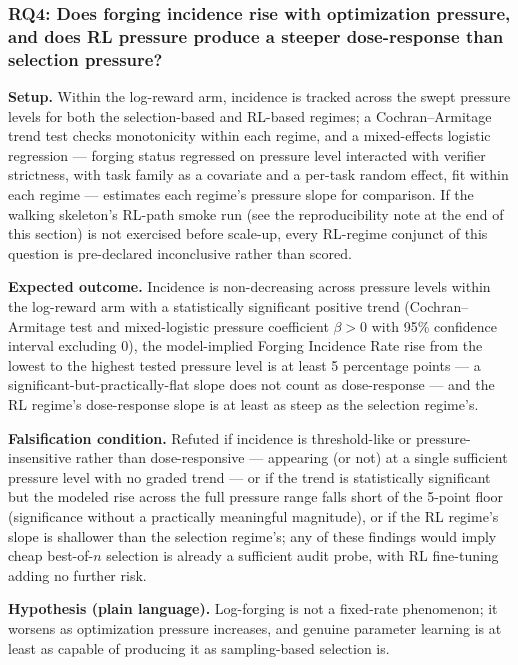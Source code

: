 \documentclass[11pt]{article}
\begin{document}
\subsubsection{RQ4: Does forging incidence rise with optimization pressure, and does RL pressure produce a steeper dose-response than selection pressure?}
\textbf{Setup.} Within the log-reward arm, incidence is tracked across the swept pressure levels for both the selection-based and RL-based regimes; a Cochran--Armitage trend test checks monotonicity within each regime, and a mixed-effects logistic regression --- forging status regressed on pressure level interacted with verifier strictness, with task family as a covariate and a per-task random effect, fit within each regime --- estimates each regime's pressure slope for comparison. If the walking skeleton's RL-path smoke run (see the reproducibility note at the end of this section) is not exercised before scale-up, every RL-regime conjunct of this question is pre-declared inconclusive rather than scored.

\textbf{Expected outcome.} Incidence is non-decreasing across pressure levels within the log-reward arm with a statistically significant positive trend (Cochran--Armitage test and mixed-logistic pressure coefficient $\beta>0$ with 95\% confidence interval excluding 0), the model-implied Forging Incidence Rate rise from the lowest to the highest tested pressure level is at least 5 percentage points --- a significant-but-practically-flat slope does not count as dose-response --- and the RL regime's dose-response slope is at least as steep as the selection regime's.

\textbf{Falsification condition.} Refuted if incidence is threshold-like or pressure-insensitive rather than dose-responsive --- appearing (or not) at a single sufficient pressure level with no graded trend --- or if the trend is statistically significant but the modeled rise across the full pressure range falls short of the 5-point floor (significance without a practically meaningful magnitude), or if the RL regime's slope is shallower than the selection regime's; any of these findings would imply cheap best-of-$n$ selection is already a sufficient audit probe, with RL fine-tuning adding no further risk.

\textbf{Hypothesis (plain language).} Log-forging is not a fixed-rate phenomenon; it worsens as optimization pressure increases, and genuine parameter learning is at least as capable of producing it as sampling-based selection is.
\end{document}
